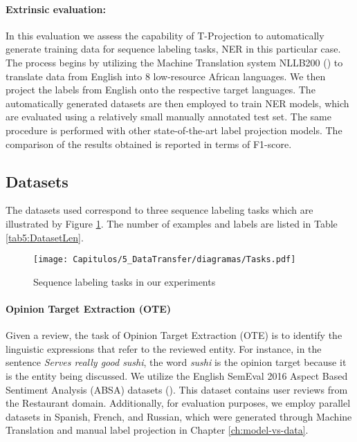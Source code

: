 \paragraph{Extrinsic evaluation:} In this evaluation we assess the capability of T-Projection to automatically generate training data for sequence labeling tasks, NER in this particular case. The process begins by utilizing the Machine Translation system NLLB200 (\cite{DBLP:journals/corr/abs-2207-04672}) to translate data from English into 8 low-resource African languages. We then project the labels from English onto the respective target languages. The automatically generated datasets are then employed to train NER models, which are evaluated using a relatively small manually annotated test set. The same procedure is performed with other state-of-the-art label projection models. The comparison of the results obtained is reported in terms of F1-score.



\subsection{Datasets}\label{sec5:datasets}
The datasets used correspond to three sequence labeling tasks which are illustrated by Figure \ref{fig:TasksChap5}. The number of examples and labels are listed in Table \ref{tab5:DatasetLen}.


\begin{figure}[htb]
    \centering
    \texttt{[image: Capitulos/5\_DataTransfer/diagramas/Tasks.pdf]}
    \caption{Sequence labeling tasks in our experiments}
    \label{fig:TasksChap5}
\end{figure}



\paragraph{Opinion Target Extraction (OTE)} Given a review, the task of Opinion Target Extraction (OTE) is to identify the linguistic expressions that refer to the reviewed entity. For instance, in the sentence \textit{Serves really good sushi}, the word \textit{sushi} is the opinion target because it is the entity being discussed. We utilize the English SemEval 2016 Aspect Based Sentiment Analysis (ABSA) datasets (\cite{pontiki-etal-2016-semeval}). This dataset contains user reviews from the Restaurant domain. Additionally, for evaluation purposes, we employ parallel datasets in Spanish, French, and Russian, which were generated through Machine Translation and manual label projection in Chapter \ref{ch:model-vs-data}. 

